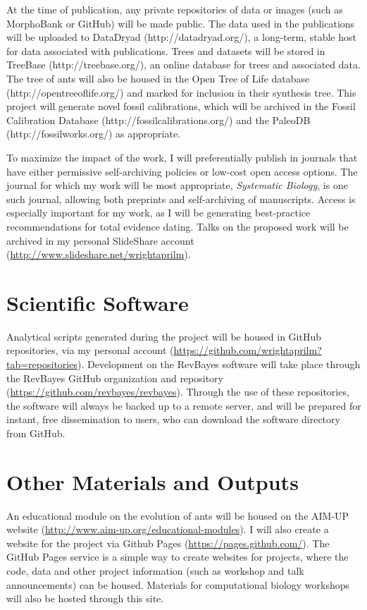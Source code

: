 \documentclass[12pt,letterpaper,indentfirst]{article}
\begin{document}
At the time of publication, any private repositories of data or images (such as MorphoBank or GitHub) will be made public. The data used in the publications will be uploaded to DataDryad (http://datadryad.org/), a long-term, stable host for data associated with publications. Trees and datasets will be stored in TreeBase (http://treebase.org/), an online database for trees and associated data. The tree of ants will also be housed in the Open Tree of Life database (http://opentreeoflife.org/) and marked for inclusion in their synthesis tree. This project will generate novel fossil calibrations, which will be archived in the Fossil Calibration Database (http://fossilcalibrations.org/) and the PaleoDB (http://fossilworks.org/) as appropriate.\par
To maximize the impact of the work, I will preferentially publish in journals that have either permissive self-archiving policies or low-cost open access options. The journal for which my work will be most appropriate, \textit{Systematic Biology}, is one such journal, allowing both preprints and self-archiving of manuscripts. Access is especially important for my work, as I will be generating best-practice recommendations for total evidence dating. Talks on the proposed work will be archived in my personal  SlideShare  account \\ (\url{http://www.slideshare.net/wrightaprilm}). \par

\section{Scientific Software}

Analytical scripts generated during the project will be housed in GitHub repositories, via my personal account (\url{https://github.com/wrightaprilm?tab=repositories}). Development on the RevBayes software will take place through the RevBayes GitHub organization and repository (\url{https://github.com/revbayes/revbayes}). Through the use of these repositories, the software will always be backed up to a remote server, and will be prepared for instant, free dissemination to users, who can download the software directory from GitHub. \par

\section{Other Materials and Outputs}

An educational module on the evolution of ants will be housed on the AIM-UP website (\url{http://www.aim-up.org/educational-modules}). I will also create a website for the project via Github Pages (\url{https://pages.github.com/}). The GitHub Pages service is a simple way to create websites for projects, where the code, data and other project information (such as workshop and talk announcements) can be housed. Materials for computational biology workshops will also be hosted through this site.\par
\end{document}
